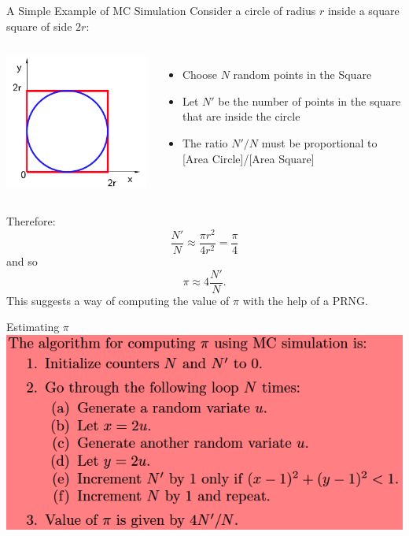 \documentclass[xcolor=x11names,compress]{beamer}
\renewcommand{\(}{\begin{columns}}
\renewcommand{\)}{\end{columns}}
\newcommand{\<}[1]{\begin{column}{#1}}
\renewcommand{\>}{\end{column}}
\begin{document}
\begin{frame}{A Simple Example of MC Simulation}
Consider a circle of radius $r$ inside a square square of side $2r$:
\begin{columns}
	\includegraphics[scale=0.4]{../figs/rng4}
	\begin{itemize}
	\item Choose $N$ random points in the Square
	\item Let $N'$ be the number of points in the square that are inside the circle
	\item The ratio $N'/N$ must be proportional to [Area Circle]/[Area Square] 
	\end{itemize}
	\end{columns}
	
Therefore:
\[
\frac{N'}{N}\approx\frac{\pi r^2}{4r^2}=\frac{\pi}{4}
\]
and so
\[
\pi \approx 4\frac{N'}{N}.
\]
This suggests a way of computing the value of $\pi$ with the help of a PRNG. 
\end{frame}
\begin{frame}{Estimating $\pi$}
\includegraphics[scale=0.5]{../figs/rng5}
\end{frame}
\end{document}
